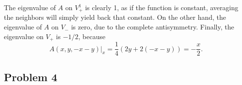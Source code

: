 \documentclass{../../mathnotes}
\begin{document}
The eigenvalue of $A$ on $V_+^1$ is clearly 1, as if the function is constant, averaging the neighbors will simply yield back that constant.
On the other hand, the eigenvalue of $A$ on $V_-$ is zero, due to the complete antisymmetry. Finally, the eigenvalue on $V_+$ is $-1/2$, because
\[A(x,y,-x-y)|_x=\frac{1}{4}\left(2y+2(-x-y)\right)=-\frac{x}{2}.\]

\subsection*{Problem 4}


\end{document}
